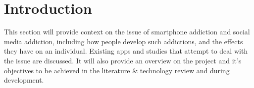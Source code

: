 \documentclass[12pt]{article}
\begin{document}
\newpage


\newpage
\tableofcontents
\listoffigures
\listoftables
\lstlistoflistings
\newpage


\begin{table}[H]
\caption[]{List of Abbreviations and Acronyms}
\label{tab:acronym-table}
\end{table}
\newpage


\section{Introduction}
This section will  provide context on the 
issue of smartphone addiction and social media addiction, including how people develop such addictions, and the 
effects they have on an individual. Existing apps and studies that attempt to deal with the issue are discussed. It will also provide an overview on the 
project and it's objectives to be achieved in the literature 
\& technology review and during development.
\end{document}
